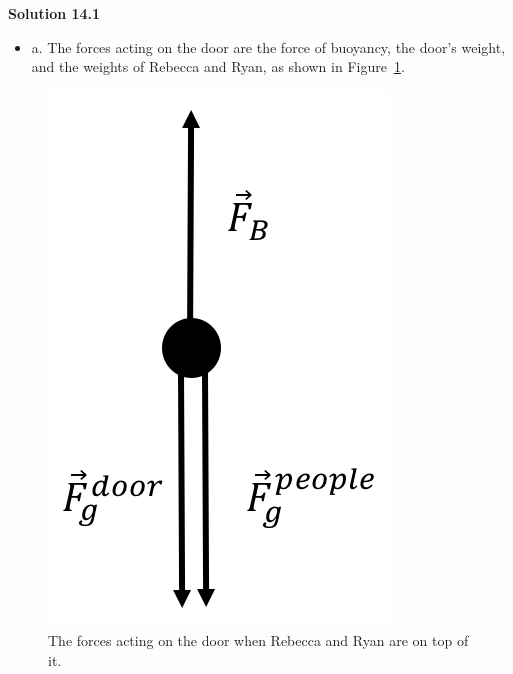 \begin{framed}
\textbf{Solution 14.1}\\
\begin{itemize}
\item a. The forces acting on the door are the force of buoyancy, the door's weight, and the weights of Rebecca and Ryan, as shown in Figure~\ref{fig:fluidmechanics:notthetitanic_fbd}.
\end{itemize}

\begin{figure}[!htbp]
\centering
\includegraphics[width=0.2\linewidth]{files/notthetitanic_fbd-5bca048002d3a8722feb70324b7a36ad.png}
\caption[]{The forces acting on the door when Rebecca and Ryan are on top of it.}
\label{fig:fluidmechanics:notthetitanic_fbd}
\end{figure}


\end{framed}

